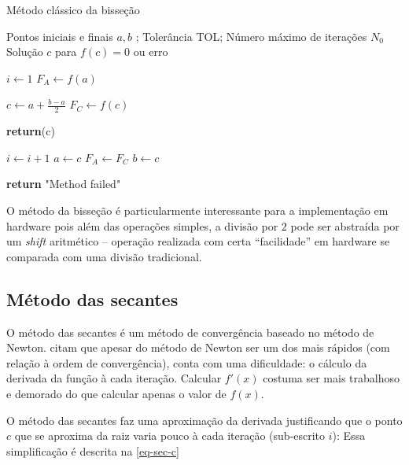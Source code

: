 \begin{algorithm}[H]
\caption{Método clássico da bisseção}
\begin{algorithmic}[1]

\Require Pontos iniciais e finais $a,b$ ; Tolerância TOL; Número máximo de iterações $N_0$
\Ensure Solução $c$ para $f(c) = 0$ ou erro

\State $i \gets 1$ 
\State $F_A \gets f(a)$ 
 

    \State $c \gets a + \frac{b-a}{2}$
    \State $F_C \gets f(c)$

        \State \textbf{return}(c)
    \EndIf

    \State $i \gets i + 1$
        \State $a\gets c$
        \State $F_A \gets F_C$
        \Else {}
            \State $b \gets c$

    \EndIf
    
\EndWhile

\State \textbf{return} "Method failed"
\end{algorithmic}
\label{alg-bi-orig}
\end{algorithm}

O método da bisseção é particularmente interessante para a implementação em hardware pois além das operações simples, a divisão por $2$ pode ser abstraída por um \textit{shift} aritmético -- operação realizada com certa  ``facilidade''\; em hardware se comparada com uma divisão tradicional.


\subsection{Método das secantes}

O método das secantes é um método de convergência baseado no método de Newton. \citeauthor{numerical-anal-burden} citam que apesar do método de Newton ser um dos mais rápidos (com relação à ordem de convergência), conta com uma dificuldade: o cálculo da derivada da função à cada iteração. Calcular $f'(x)$ costuma ser mais trabalhoso e demorado do que calcular apenas o valor de $f(x)$.

O método das secantes faz uma aproximação da derivada justificando que o ponto $c$ que se aproxima da raiz varia pouco à cada iteração (sub-escrito $i$): Essa simplificação é descrita na \autoref{eq-sec-c}

